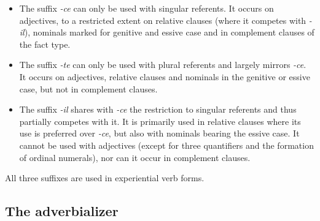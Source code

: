\begin{itemize}
	\item	The suffix \textit{-ce} can only be used with singular referents. It occurs on adjectives, to a restricted extent on relative clauses (where it competes with \textit{-il}), nominals marked for genitive and essive case and in complement clauses of the fact type.
	\item	The suffix \textit{-te} can only be used with plural referents and largely mirrors \textit{-ce}. It occurs on adjectives, relative clauses and nominals in the genitive or essive case, but not in complement clauses.
	\item	The suffix \textit{-il} shares with \textit{-ce} the restriction to singular referents and thus partially competes with it. It is primarily used in relative clauses where its use is preferred over \textit{-ce}, but also with nominals bearing the essive case. It cannot be used with adjectives (except for three quantifiers and the formation of ordinal numerals), nor can it occur in complement clauses.
\end{itemize}
 
All three suffixes are used in experiential verb forms.


\subsection{The adverbializer }
\label{ssec:The adverbializer -le}

